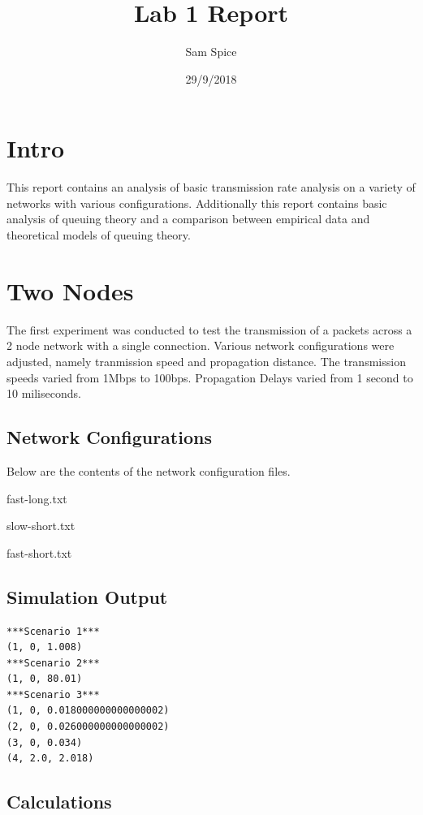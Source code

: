 \documentclass[12pt]{article}
\title{Lab 1 Report}
\author{Sam Spice}
\date{29/9/2018}
\begin{document}
\maketitle

\section{Intro}

This report contains an analysis of basic transmission rate analysis on a variety of networks with various configurations. Additionally this report contains basic analysis of queuing theory and a comparison between empirical data and theoretical models of queuing theory.

\section{Two Nodes}
The first experiment was conducted to test the transmission of a packets across a 2 node network with a single connection. Various network configurations were adjusted, namely tranmission speed and propagation distance. The transmission speeds varied from 1Mbps to 100bps. Propagation Delays varied from 1 second to 10 miliseconds.

\subsection{Network Configurations}

Below are the contents of the network configuration files.
\linebreak
\centerline{fast-long.txt}


\centerline{slow-short.txt}


\centerline{fast-short.txt}


\subsection{Simulation Output}
\begin{verbatim}
***Scenario 1***
(1, 0, 1.008)
***Scenario 2***
(1, 0, 80.01)
***Scenario 3***
(1, 0, 0.018000000000000002)
(2, 0, 0.026000000000000002)
(3, 0, 0.034)
(4, 2.0, 2.018)
\end{verbatim}

\subsection{Calculations}
\end{document}
